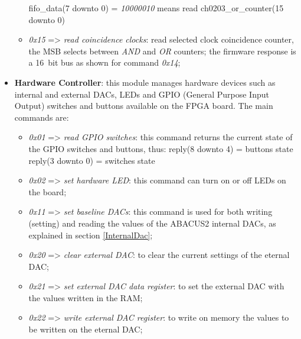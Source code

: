 \begin{itemize}
\begin{itemize}
		\newline
		fifo\_data(7 downto 0) = \textit{10000010} means read ch0203\_or\_counter(15 downto 0)
		\item \textit{0x15} => \textit{read coincidence clocks}: read selected clock coincidence counter, the MSB selects between \textit{AND} and \textit{OR} counters; the firmware response is a 16~bit bus as shown for command \textit{0x14};
	\end{itemize}
	
	\item \textbf{Hardware Controller}: this module manages hardware devices such as internal and external DACs, LEDs and GPIO (General Purpose Input Output) switches and buttons available on the FPGA board. The main commands are:
	\begin{itemize}
		\item \textit{0x01} => \textit{read GPIO switches}: this command returns the current state of the GPIO switches and buttons, thus:
		\newline
		reply(8 downto 4) = buttons state
		\newline
		reply(3 downto 0) = switches state
		\item \textit{0x02} => \textit{set hardware LED}: this command can turn on or off LEDs on the board;
		\item \textit{0x11} => \textit{set baseline DACs}: this command is used for both writing (setting) and reading the values of the ABACUS2 internal DACs, as explained in section \ref{InternalDac};
		\item \textit{0x20} => \textit{clear external DAC}: to clear the current settings of the eternal DAC;
		\item \textit{0x21} => \textit{set external DAC data register}: to set the external DAC with the values written in the RAM;
		\item \textit{0x22} => \textit{write external DAC register}: to write on memory the values to be written on the eternal DAC;
	\end{itemize}  
		
\end{itemize}
